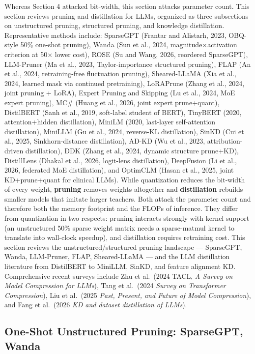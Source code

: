 Whereas Section 4 attacked bit-width, this section attacks parameter count. This section reviews pruning and distillation for LLMs, organized as three subsections on unstructured pruning, structured pruning, and knowledge distillation. Representative methods include: SparseGPT (Frantar and Alistarh, 2023, OBQ-style 50\% one-shot pruning), Wanda (Sun et al., 2024, magnitude×activation criterion at 50× lower cost), ROSE (Su and Wang, 2026, reordered SparseGPT), LLM-Pruner (Ma et al., 2023, Taylor-importance structured pruning), FLAP (An et al., 2024, retraining-free fluctuation pruning), Sheared-LLaMA (Xia et al., 2024, learned mask via continued pretraining), LoRAPrune (Zhang et al., 2024, joint pruning + LoRA), Expert Pruning and Skipping (Lu et al., 2024, MoE expert pruning), MC\# (Huang et al., 2026, joint expert prune+quant), DistilBERT (Sanh et al., 2019, soft-label student of BERT), TinyBERT (2020, attention+hidden distillation), MiniLM (2020, last-layer self-attention distillation), MiniLLM (Gu et al., 2024, reverse-KL distillation), SinKD (Cui et al., 2025, Sinkhorn-distance distillation), AD-KD (Wu et al., 2023, attribution-driven distillation), DDK (Zhang et al., 2024, dynamic structure prune+KD), DistillLens (Dhakal et al., 2026, logit-lens distillation), DeepFusion (Li et al., 2026, federated MoE distillation), and OptimCLM (Hasan et al., 2025, joint KD+prune+quant for clinical LLMs). While quantization reduces the bit-width of every weight, \textbf{pruning} removes weights altogether and \textbf{distillation} rebuilds smaller models that imitate larger teachers. Both attack the parameter count and therefore both the memory footprint and the FLOPs of inference. They differ from quantization in two respects: pruning interacts strongly with kernel support (an unstructured 50\% sparse weight matrix needs a sparse-matmul kernel to translate into wall-clock speedup), and distillation requires retraining cost. This section reviews the unstructured/structured pruning landscape --- SparseGPT, Wanda, LLM-Pruner, FLAP, Sheared-LLaMA --- and the LLM distillation literature from DistilBERT to MiniLLM, SinKD, and feature alignment KD. Comprehensive recent surveys include Zhu et al.~(2024 TACL, \emph{A Survey on Model Compression for LLMs}), Tang et al.~(2024 \emph{Survey on Transformer Compression}), Liu et al.~(2025 \emph{Past, Present, and Future of Model Compression}), and Fang et al.~(2026 \emph{KD and dataset distillation of LLMs}).

\subsection{One-Shot Unstructured Pruning: SparseGPT, Wanda}\label{one-shot-unstructured-pruning-sparsegpt-wanda}

